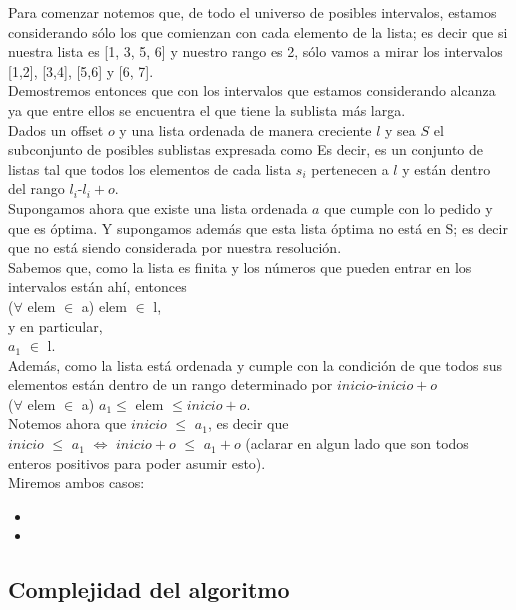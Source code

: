 Para comenzar notemos que, de todo el universo de posibles intervalos, estamos considerando s\'olo los que comienzan con cada elemento de la lista; es decir que si nuestra lista es [1, 3, 5, 6] y nuestro rango es 2, s\'olo vamos a mirar los intervalos [1,2], [3,4], [5,6] y [6, 7].\\
Demostremos entonces que con los intervalos que estamos considerando alcanza ya que entre ellos se encuentra el que tiene la sublista m\'as larga.\\
Dados un offset $o$ y una lista ordenada de manera creciente $l$ y sea $S$ el subconjunto de posibles sublistas expresada como %
Es decir, es un conjunto de listas tal que todos los elementos de cada lista $s_i$ pertenecen a $l$ y est\'an dentro del rango $l_i$-$l_i + o$.\\
Supongamos ahora que existe una lista ordenada $a$ que cumple con lo pedido y que es \'optima. Y supongamos adem\'as que esta lista \'optima no est\'a en S; es decir que no est\'a siendo considerada por nuestra resoluci\'on.\\
Sabemos que, como la lista es finita y los n\'umeros que pueden entrar en los intervalos est\'an ah\'i, entonces \\
($\forall$ elem $\in$ a) elem $\in$ l, \\
y en particular, \\
$a_1$ $\in$ l. \\
Adem\'as, como la lista est\'a ordenada y cumple con la condici\'on de que todos sus elementos est\'an dentro de un rango determinado por $inicio$-$inicio + o$\\
($\forall$ elem $\in$ a) $a_1 \leq$ elem $\leq inicio + o$.\\
Notemos ahora que $inicio$ $\leq$ $a_1$, es decir que \\ 
$inicio$ $\leq$ $a_1$ $\Leftrightarrow$ $inicio + o$ $\leq$ $a_1 + o$
(aclarar en algun lado que son todos enteros positivos para poder asumir esto).\\
Miremos ambos casos:
\begin{itemize}
\item %
\item 
\end{itemize}

\subsection{Complejidad del algoritmo}

